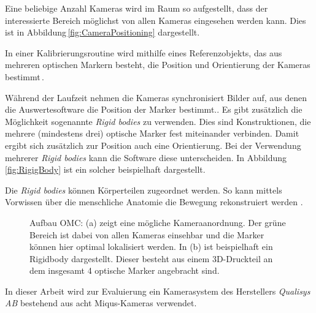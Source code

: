 Eine beliebige Anzahl Kameras wird im Raum so aufgestellt, dass der interessierte Bereich möglichst von allen Kameras eingesehen werden kann. Dies ist in Abbildung\,\ref{fig:CameraPositioning} dargestellt.

In einer Kalibrierungsroutine wird mithilfe eines Referenzobjekts, das aus mehreren optischen Markern besteht, die Position und Orientierung der Kameras bestimmt\,\cite{qualisys_ab_qtm-user-manual_nodate}.

Während der Laufzeit nehmen die Kameras synchronisiert Bilder auf, aus denen die Auswertesoftware die Position der Marker bestimmt.. Es gibt zusätzlich die Möglichkeit sogenannte \textit{Rigid bodies} zu verwenden. Dies sind Konstruktionen, die mehrere (mindestens drei) optische Marker fest miteinander verbinden. Damit ergibt sich zusätzlich zur Position auch eine Orientierung. Bei der Verwendung mehrerer \textit{Rigid bodies} kann die Software diese unterscheiden. In Abbildung\,\ref{fig:RigigBody} ist ein solcher beispielhaft dargestellt.

Die \textit{Rigid bodies} können Körperteilen zugeordnet werden. So kann mittels Vorwissen über die menschliche Anatomie die Bewegung rekonstruiert werden \cite{qualisys_ab_qtm-user-manual_nodate}.

\begin{figure}[h]
    \centering
    \caption{Aufbau OMC: (a) zeigt eine mögliche Kameraanordnung. Der grüne Bereich ist dabei von allen Kameras einsehbar und die Marker können hier optimal lokalisiert werden. In (b) ist beispielhaft ein Rigidbody dargestellt. Dieser besteht aus einem 3D-Druckteil an dem insgesamt 4 optische Marker angebracht sind.}
    \label{fig:OMCUse}
\end{figure}
In dieser Arbeit wird zur Evaluierung ein Kamerasystem des Herstellers \textit{Qualisys AB} bestehend aus acht Miqus-Kameras \cite{noauthor_miqus_nodate} verwendet.


